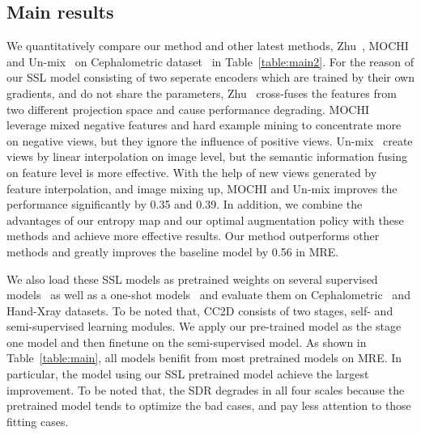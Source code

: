 \documentclass[10pt,twocolumn,letterpaper]{article}
\begin{document}
\subsection{Main results}
We quantitatively compare our method and other latest methods, Zhu~\cite{zhu2021improving}, MOCHI~\cite{kalantidis2020hard} and Un-mix~\cite{shen2022mix} on Cephalometric dataset~\cite{wang2016benchmark} in Table~\ref{table:main2}. 
For the reason of our SSL model consisting of two seperate encoders which are trained by their own gradients, and do not share the parameters, Zhu~\cite{zhu2021improving} cross-fuses the features from two different projection space and cause performance degrading. MOCHI~\cite{kalantidis2020hard} leverage mixed negative features and hard example mining to concentrate more on negative views, but they ignore the influence of positive views. Un-mix~\cite{shen2022mix} create views by linear interpolation on image level, but the semantic information fusing on feature level is more effective.
With the help of new views generated by feature interpolation, and image mixing up, MOCHI and Un-mix improves the performance significantly by 0.35 and 0.39. 
In addition, we combine the advantages of our entropy map and our optimal augmentation policy with these methods and achieve more effective results. Our method outperforms other methods and greatly improves the baseline model by 0.56 in MRE.

We also load these SSL models as pretrained weights on several supervised models~\cite{ref_scn,zhu2021you,McCouat_2022_CVPR} as well as a one-shot models~\cite{yao2021one} and evaluate them on Cephalometric~\cite{wang2016benchmark} and Hand-Xray datasets. To be noted that, CC2D consists of two stages, self- and semi-supervised learning modules. We apply our pre-trained model as the stage one model and then finetune on the semi-supervised model. As shown in Table~\ref{table:main}, all models benifit from most pretrained models on MRE. In particular, the model using our SSL pretrained model achieve the largest improvement. To be noted that, the SDR degrades in all four scales because the pretrained model tends to optimize the bad cases, and pay less attention to those fitting cases. 
\end{document}
